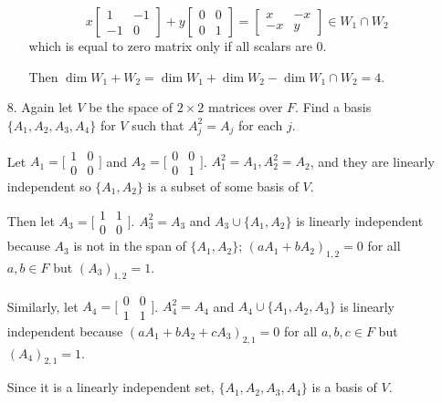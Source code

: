 \documentclass{article}
\begin{document}
\begin{enumerate}[listparindent=\parindent]
\begin{enumerate}[listparindent=\parindent]
    \[
        x \begin{bmatrix} 1 & -1 \\ -1 & 0 \end{bmatrix} +
        y \begin{bmatrix} 0 & 0 \\ 0 & 1 \end{bmatrix}
        =
        \begin{bmatrix}
            x & -x \\
            -x & y
        \end{bmatrix}
        \in W_1 \cap W_2
    \]
    which is equal to zero matrix only if all scalars are 0.

    Then \(\dim W_1 + W_2 = \dim W_1 + \dim W_2 - \dim W_1 \cap W_2 = 4\).
\end{enumerate}

\item[8.] Again let \(V\) be the space of \(2 \times 2\) matrices over \(F\).
    Find a basis \(\{A_1, A_2,\allowbreak A_3, A_4\}\) for \(V\) such that \(A_j^2 = A_j\) for each \(j\).

Let \(A_1 = \lbrack\begin{smallmatrix} 1 & 0 \\ 0 & 0 \end{smallmatrix}\rbrack\)
and \(A_2 = \lbrack\begin{smallmatrix} 0 & 0 \\ 0 & 1 \end{smallmatrix}\rbrack\).
\(A_1^2 = A_1, A_2^2 = A_2\), and they are linearly independent so \(\{A_1, A_2\}\) is a subset of some basis of \(V\).

Then let \(A_3 = \lbrack\begin{smallmatrix} 1 & 1 \\ 0 & 0 \end{smallmatrix}\rbrack\).
\(A_3^2 = A_3\) and \({A_3} \cup \{A_1, A_2\}\) is linearly independent because
\(A_3\) is not in the span of \(\{A_1, A_2\}\); \((aA_1 + bA_2)_{1,2} = 0\) for all \(a, b \in F\) but \((A_3)_{1,2} = 1\).

Similarly, let \(A_4 = \lbrack\begin{smallmatrix} 0 & 0 \\ 1 & 1 \end{smallmatrix}\rbrack\).
\(A_4^2 = A_4\) and \({A_4} \cup \{A_1, A_2, A_3\}\) is linearly independent because
\((aA_1 + bA_2 + cA_3)_{2,1} = 0\) for all \(a, b, c \in F\) but \((A_4)_{2,1} = 1\).

Since it is a linearly independent set, \(\{A_1, A_2, A_3, A_4\}\) is a basis of \(V\).


\end{enumerate}
\end{document}
